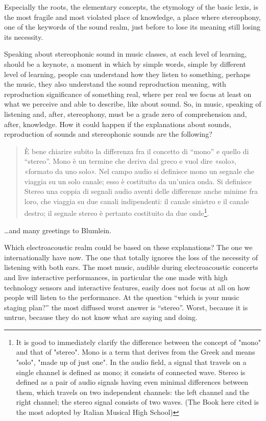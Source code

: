 \documentclass{article}
\begin{document}
Especially the roots, the elementary concepts, the etymology of the basic lexis, is the most fragile and most violated place of knowledge, a place where stereophony, one of the keywords of the sound realm, just before to lose its meaning still losing its necessity.

Speaking about stereophonic sound in music classes, at each level of learning, should be a keynote, a moment in which by simple words, simple by different level of learning, people can understand how they listen to something, perhaps the music, they also understand the sound reproduction meaning, with reproduction significance of something real, where per real we focus at least on what we perceive and able to describe, like about sound. So, in music, speaking of listening and, after, stereophony, must be a grade zero of comprehension and, after, knowledge. How it could happen if the explanations about sounds, reproduction of sounds and stereophonic sounds are the following?

\begin{quotation}
È bene chiarire subito la differenza fra il concetto di “mono” e quello di “stereo”. Mono è un termine che deriva dal greco e vuol dire «solo», «formato da uno solo». Nel campo audio si definisce mono un segnale che viaggia su un solo canale; esso è costituito da un'unica onda. Si definisce Stereo una coppia di segnali audio aventi delle differenze anche minime fra loro, che viaggia su due canali indipendenti: il canale sinistro e il canale destro; il segnale stereo è pertanto costituito da due onde\footnote{It is good to immediately clarify the difference between the concept of "mono" and that of "stereo". Mono is a term that derives from the Greek and means "solo", "made up of just one". In the audio field, a signal that travels on a single channel is defined as mono; it consists of connected wave. Stereo is defined as a pair of audio signals having even minimal differences between them, which travels on two independent channels: the left channel and the right channel; the stereo signal consists of two waves. (The Book here cited is the most adopted by Italian Musical High School)}. \cite{labtec01}
\end{quotation}

\ldots and many greetings to Blumlein.

Which electroacoustic realm could be based on these explanations? The one we internationally have now. The one that totally ignores the loss of the necessity of listening with both ears. The most music, audible during electroacoustic concerts and live interactive performances, in particular the one made with high technology sensors and interactive features, easily does not focus at all on how people will listen to the performance. At the question “which is your music staging plan?” the most diffused worst answer is “stereo”. Worst, because it is untrue, because they do not know what are saying and doing.
\end{document}
